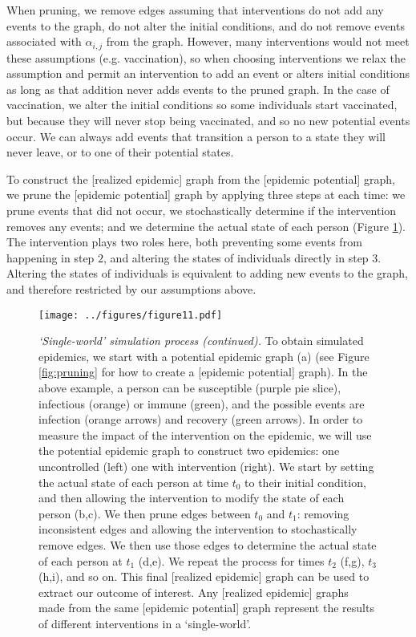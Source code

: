 \documentclass[PTRSB]{rsos}
\makeatletter
\def\checkGraphicsWidth{\ifdim\Gin@nat@width>\linewidth
	\tsGraphicsScaleX\linewidth\else\Gin@nat@width\fi}
\let\ts@includegraphics\includegraphics
\renewcommand{\includegraphics}[1]{\ts@includegraphics[width=\checkGraphicsWidth]{#1}}
\makeatother
\begin{document}
\begin{multicols}{2}
When pruning, we remove edges assuming that interventions do not add any events to the graph, do not alter the initial conditions, and do not remove events associated with $\alpha_{i,j}$ from the graph.
However, many interventions would not meet these assumptions (e.g. vaccination), so when choosing interventions we relax the assumption and permit an intervention to add an event or alters initial conditions as long as that addition never adds events to the pruned graph.
In the case of vaccination, we alter the initial conditions so some individuals start vaccinated, but because they will never stop being vaccinated, and so no new potential events occur.
We can always add events that transition a person to a state they will never leave, or to one of their potential states.

To construct the [realized epidemic] graph from the [epidemic potential] graph, we prune the [epidemic potential] graph by applying three steps at each time: we prune events that did not occur, we stochastically determine if the intervention removes any events; and we determine the actual state of each person (Figure \ref{fig:actualizing}).
The intervention plays two roles here, both preventing some events from happening in step $2$, and altering the states of individuals directly in step $3$.
Altering the states of individuals is equivalent to adding new events to the graph, and therefore restricted by our assumptions above.

\begin{figure}[hp]
\texttt{[image: ../figures/figure11.pdf]}
\caption{\textit{‘Single-world’ simulation process (continued).}
  To obtain simulated epidemics, we start with a potential epidemic graph (a) (see Figure \ref{fig:pruning} for how to create a [epidemic potential] graph).
  In the above example, a person can be susceptible (purple pie slice), infectious (orange) or immune (green), and the possible events are infection (orange arrows) and recovery (green arrows). %
  In order to measure the impact of the intervention on the epidemic, we will use the potential epidemic graph to construct two epidemics: one uncontrolled (left) one with intervention (right).
  We start by setting the actual state of each person at time $t_0$ to their initial condition, and then allowing the intervention to modify the state of each person (b,c).
  We then prune edges between $t_0$ and $t_1$: removing inconsistent edges and allowing the intervention to stochastically remove edges.
  We then use those edges to determine the actual state of each person at $t_1$ (d,e).
  We repeat the process for times $t_2$ (f,g), $t_3$ (h,i), and so on.
  This final [realized epidemic] graph can be used to extract our outcome of interest.
  Any [realized epidemic] graphs made from the same [epidemic potential] graph represent the results of different interventions in a `single-world'.
}
\label{fig:actualizing}
\end{figure}


\end{multicols}
\end{document}

